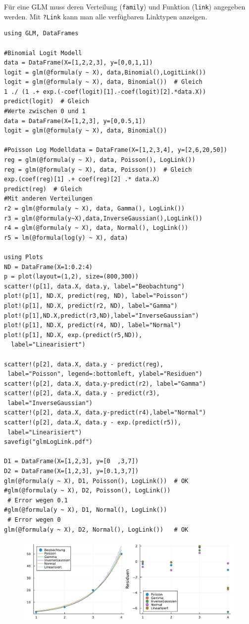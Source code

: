 \documentclass[10pt,twocolumn]{scrartcl}
\begin{document}
Für eine GLM muss deren Verteilung (\lstinline|family|) und Funktion
(\lstinline|link|) angegeben werden. Mit \lstinline|?Link| kann man alle verfügbaren Linktypen anzeigen.

\begin{lstlisting}
using GLM, DataFrames

#Binomial Logit Modell
data = DataFrame(X=[1,2,2,3], y=[0,0,1,1])
logit = glm(@formula(y ~ X), data,Binomial(),LogitLink())
logit = glm(@formula(y ~ X), data, Binomial())  # Gleich
1 ./ (1 .+ exp.(-coef(logit)[1].-coef(logit)[2].*data.X))
predict(logit)  # Gleich
#Werte zwischen 0 und 1
data = DataFrame(X=[1,2,3], y=[0,0.5,1])
logit = glm(@formula(y ~ X), data, Binomial())

#Poisson Log Modelldata = DataFrame(X=[1,2,3,4], y=[2,6,20,50])
reg = glm(@formula(y ~ X), data, Poisson(), LogLink())
reg = glm(@formula(y ~ X), data, Poisson())  # Gleich
exp.(coef(reg)[1] .+ coef(reg)[2] .* data.X)
predict(reg)  # Gleich
#Mit anderen Verteilungen
r2 = glm(@formula(y ~ X), data, Gamma(), LogLink())
r3 = glm(@formula(y~X),data,InverseGaussian(),LogLink())
r4 = glm(@formula(y ~ X), data, Normal(), LogLink())
r5 = lm(@formula(log(y) ~ X), data)

using Plots
ND = DataFrame(X=1:0.2:4)
p = plot(layout=(1,2), size=(800,300))
scatter!(p[1], data.X, data.y, label="Beobachtung")
plot!(p[1], ND.X, predict(reg, ND), label="Poisson")
plot!(p[1], ND.X, predict(r2, ND), label="Gamma")
plot!(p[1],ND.X,predict(r3,ND),label="InverseGaussian")
plot!(p[1], ND.X, predict(r4, ND), label="Normal")
plot!(p[1], ND.X, exp.(predict(r5,ND)),
  label="Linearisiert")

scatter!(p[2], data.X, data.y - predict(reg),
 label="Poisson", legend=:bottomleft, ylabel="Residuen")
scatter!(p[2], data.X, data.y-predict(r2), label="Gamma")
scatter!(p[2], data.X, data.y - predict(r3),
 label="InverseGaussian")
scatter!(p[2], data.X, data.y-predict(r4),label="Normal")
scatter!(p[2], data.X, data.y - exp.(predict(r5)),
 label="Linearisiert")
savefig("glmLogLink.pdf")

D1 = DataFrame(X=[1,2,3], y=[0  ,3,7])
D2 = DataFrame(X=[1,2,3], y=[0.1,3,7])
glm(@formula(y ~ X), D1, Poisson(), LogLink())  # OK
#glm(@formula(y ~ X), D2, Poisson(), LogLink())
 # Error wegen 0.1
#glm(@formula(y ~ X), D1, Normal(), LogLink())
 # Error wegen 0
glm(@formula(y ~ X), D2, Normal(), LogLink())   # OK
\end{lstlisting}

\begin{figure}[ht]
  \centering
  \includegraphics[width=.95\columnwidth]{glmLogLink.pdf}
\end{figure}
\end{document}
